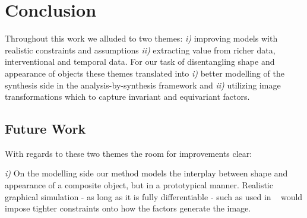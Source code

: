 

\chapter{Conclusion}
	Throughout this work we alluded to two themes: \emph{i)} improving models with realistic constraints and assumptions \emph{ii)} extracting value from richer data, \ie interventional and temporal data.
	For our task of disentangling shape and appearance of objects these themes translated into \emph{i)} better modelling of the synthesis side in the analysis-by-synthesis framework and \emph{ii)} utilizing image transformations \wrt which to capture invariant and equivariant factors.


\section{Future Work}\label{sec:futurework}


	With regards to these two themes the room for improvements clear:


	\emph{i)} On the modelling side our method models the interplay between shape and appearance of a composite object, but in a prototypical manner. Realistic graphical simulation - as long as it is fully differentiable - such as used in ~\cite{kulkarni15dcign, tieleman14thesis} would impose tighter constraints onto how the factors generate the image.


